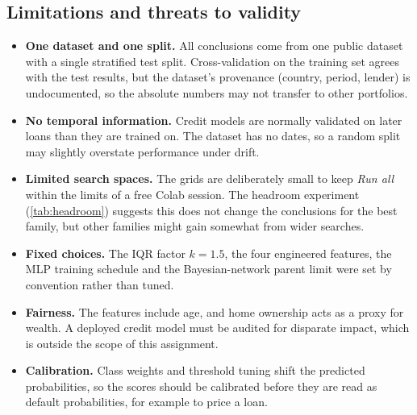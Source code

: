 \subsection{Limitations and threats to validity}
\begin{itemize}
  \item \textbf{One dataset and one split.} All conclusions come from one public dataset with a single stratified test split. Cross-validation on the training set agrees with the test results, but the dataset's provenance (country, period, lender) is undocumented, so the absolute numbers may not transfer to other portfolios.
  \item \textbf{No temporal information.} Credit models are normally validated on later loans than they are trained on. The dataset has no dates, so a random split may slightly overstate performance under drift.
  \item \textbf{Limited search spaces.} The grids are deliberately small to keep \emph{Run all} within the limits of a free Colab session. The headroom experiment (\cref{tab:headroom}) suggests this does not change the conclusions for the best family, but other families might gain somewhat from wider searches.
  \item \textbf{Fixed choices.} The IQR factor $k = 1.5$, the four engineered features, the MLP training schedule and the Bayesian-network parent limit were set by convention rather than tuned.
  \item \textbf{Fairness.} The features include age, and home ownership acts as a proxy for wealth. A deployed credit model must be audited for disparate impact, which is outside the scope of this assignment.
  \item \textbf{Calibration.} Class weights and threshold tuning shift the predicted probabilities, so the scores should be calibrated before they are read as default probabilities, for example to price a loan.
\end{itemize}
